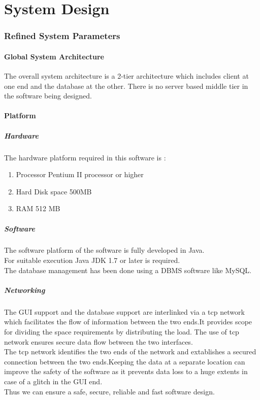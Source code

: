 \documentclass[a4paper]{article}
\begin{document}
\part{System Design}
\section{Refined System Parameters}
\subsection{Global System Architecture}
The overall system architecture is a 2-tier architecture which includes client at one end and the
database at the other. There is no server based middle tier in the software being designed.
\subsection{Platform}
\subsubsection{Hardware}
The hardware platform required in this software is :
\begin {enumerate}
	\item Processor Pentium II processor or higher
	\item Hard Disk space 500MB
	\item RAM 512 MB
	\end{enumerate}
\subsubsection{Software}
The software platform of the software is fully developed in Java.\\
For suitable execution Java JDK 1.7 or later is required.\\
The database management has been done using a DBMS software like MySQL.\\

\subsubsection{Networking}
The GUI support and the database support are interlinked via a tcp network which facilitates the flow of information between the two ends.It provides scope for dividing the space requirements by distributing the load. The use of tcp network ensures secure data flow between the two interfaces.\\
The tcp network identifies the two ends of the network and extablishes a secured connection between the two ends.Keeping the data at a separate location can improve the safety of the software as it prevents data loss to a huge extents in case of a glitch in the GUI end.
\\
Thus we can ensure a safe, secure, reliable and fast software design.\\
\end{document}
